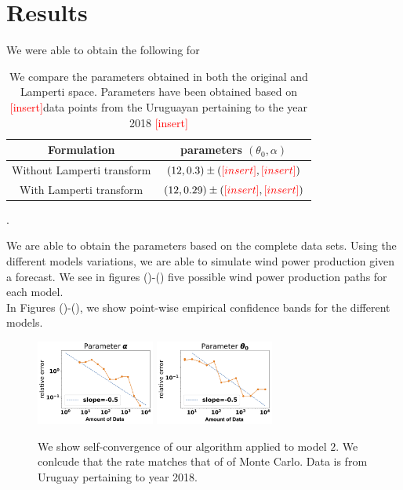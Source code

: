 \documentclass[10pt,twocolumn,letterpaper]{article}
\newcommand{\add}{\textcolor{red}{[insert]}}
\begin{document}
\section{Results}


We were able to obtain the following for 
\begin{table}[]
\centering
\begin{tabular}{|c|c|}
\hline
Formulation   &  parameters $(\theta_0, \alpha)$    \\ \hline
Without Lamperti transform &   $(12,0.3) \pm (\add , \add) $   \\ \hline
With Lamperti transform &   $(12,0.29) \pm (\add , \add)  $   \\ \hline
\end{tabular}
\caption{We compare the parameters obtained in both the original and Lamperti space. Parameters have been obtained based on \add data points from the Uruguayan pertaining to the year 2018  \add }.
\label{tab:model_comparison}
\end{table}


 We are able to obtain the parameters based on the complete data sets. Using the different models variations, we are able to simulate wind power production given a forecast. We see in figures ()-()
five possible wind power production paths for each model.\\


In Figures ()-(), we show point-wise empirical confidence bands for the different models.

\begin{figure}
  \includegraphics[width=39mm,scale=1]{plots/alpha_conv_beta.png}
  \includegraphics[width=39mm,scale=1]{plots/theta_conv_beta.png}
  \caption{We show self-convergence of our algorithm applied to model $2$. We conlcude that the rate  matches that of of Monte Carlo. Data is from Uruguay pertaining to  year 2018. }
\end{figure}
\end{document}
